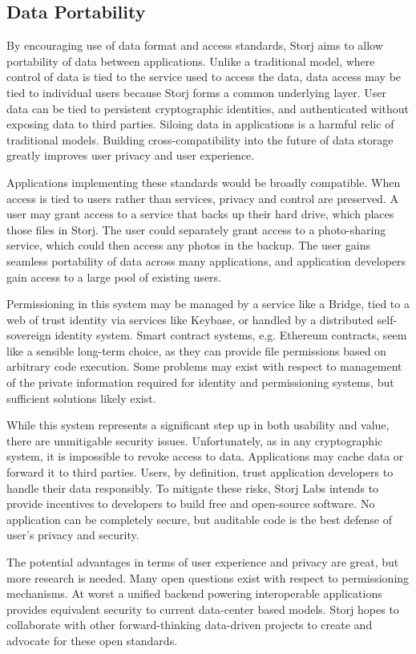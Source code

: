 \documentclass[a4paper,10pt]{article}
\begin{document}
\subsection{Data Portability}
By encouraging use of data format and access standards, Storj aims to allow portability of data between applications. Unlike a traditional model, where control of data is tied to the service used to access the data, data access may be tied to individual users because Storj forms a common underlying layer. User data can be tied to persistent cryptographic identities, and authenticated without exposing data to third parties. Siloing data in applications is a harmful relic of traditional models. Building cross-compatibility into the future of data storage greatly improves user privacy and user experience.

Applications implementing these standards would be broadly compatible. When access is tied to users rather than services, privacy and control are preserved. A user may grant access to a service that backs up their hard drive, which places those files in Storj. The user could separately grant access to a photo-sharing service, which could then access any photos in the backup. The user gains seamless portability of data across many applications, and application developers gain access to a large pool of existing users.

Permissioning in this system may be managed by a service like a Bridge, tied to a web of trust identity via services like Keybase, or handled by a distributed self-sovereign identity system. Smart contract systems, e.g. Ethereum \cite{17} contracts, seem like a sensible long-term choice, as they can provide file permissions based on arbitrary code execution. Some problems may exist with respect to management of the private information required for identity and permissioning systems, but sufficient solutions likely exist.

While this system represents a significant step up in both usability and value, there are unmitigable security issues. Unfortunately, as in any cryptographic system, it is impossible to revoke access to data. Applications may cache data or forward it to third parties. Users, by definition, trust application developers to handle their data responsibly. To mitigate these risks, Storj Labs intends to provide incentives to developers to build free and open-source software. No application can be completely secure, but auditable code is the best defense of user’s privacy and security.

The potential advantages in terms of user experience and privacy are great, but more research is needed. Many open questions exist with respect to permissioning mechanisms. At worst a unified backend powering interoperable applications provides equivalent security to current data-center based models. Storj hopes to collaborate with other forward-thinking data-driven projects to create and advocate for these open standards.
\end{document}
